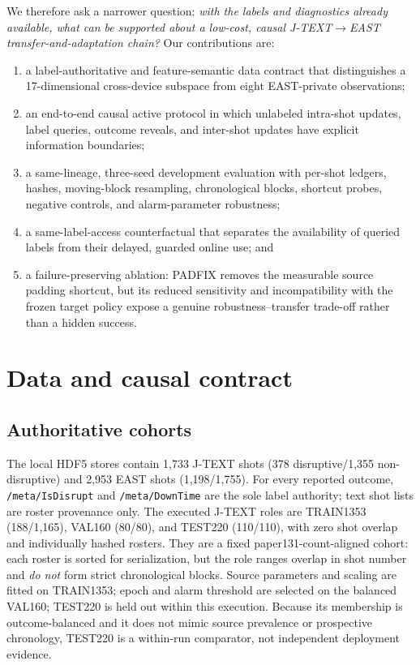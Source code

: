 \documentclass[10pt,twocolumn]{article}
\newcommand{\jtext}{J-TEXT}
\newcommand{\east}{EAST}
\begin{document}
We therefore ask a narrower question: \emph{with the labels and diagnostics already available, what can be supported about a low-cost, causal \jtext{}$\rightarrow$\east{} transfer-and-adaptation chain?}  Our contributions are:

\begin{enumerate}
  \item a label-authoritative and feature-semantic data contract that distinguishes a 17-dimensional cross-device subspace from eight \east{}-private observations;
  \item an end-to-end causal active protocol in which unlabeled intra-shot updates, label queries, outcome reveals, and inter-shot updates have explicit information boundaries;
  \item a same-lineage, three-seed development evaluation with per-shot ledgers, hashes, moving-block resampling, chronological blocks, shortcut probes, negative controls, and alarm-parameter robustness;
  \item a same-label-access counterfactual that separates the availability of queried labels from their delayed, guarded online use; and
  \item a failure-preserving ablation: PADFIX removes the measurable source padding shortcut, but its reduced sensitivity and incompatibility with the frozen target policy expose a genuine robustness--transfer trade-off rather than a hidden success.
\end{enumerate}

\section{Data and causal contract}

\subsection{Authoritative cohorts}

The local HDF5 stores contain 1,733 \jtext{} shots (378 disruptive/1,355 non-disruptive) and 2,953 \east{} shots (1,198/1,755).  For every reported outcome, \texttt{/meta/IsDisrupt} and \texttt{/meta/DownTime} are the sole label authority; text shot lists are roster provenance only.  The executed \jtext{} roles are TRAIN1353 (188/1,165), VAL160 (80/80), and TEST220 (110/110), with zero shot overlap and individually hashed rosters.  They are a fixed paper131-count-aligned cohort: each roster is sorted for serialization, but the role ranges overlap in shot number and \emph{do not} form strict chronological blocks.  Source parameters and scaling are fitted on TRAIN1353; epoch and alarm threshold are selected on the balanced VAL160; TEST220 is held out within this execution.  Because its membership is outcome-balanced and it does not mimic source prevalence or prospective chronology, TEST220 is a within-run comparator, not independent deployment evidence.
\end{document}
